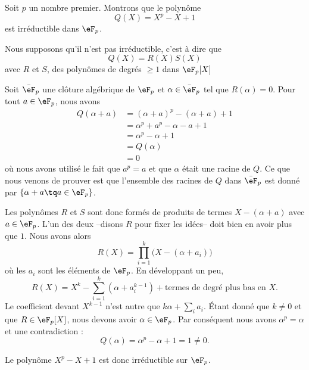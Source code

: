 \begin{example}     \label{ExfUqQXQ}
    Soit \( p\) un nombre premier. Montrons que le polynôme
    \begin{equation}
        Q(X)=X^p-X+1
    \end{equation}
    est irréductible dans \( \eF_p\).

    Nous supposons qu'il n'est pas irréductible, c'est à dire que
    \begin{equation}
        Q(X)=R(X)S(X)
    \end{equation}
    avec \( R\) et \( S\), des polynômes de degrés \( \geq 1\) dans \( \eF_p[X]\)

    Soit \( \bar\eF_p\) une clôture algébrique de \( \eF_p\) et \( \alpha\in \bar \eF_p\) tel que \( R(\alpha)=0\). Pour tout \( a\in \eF_p\), nous avons
    \begin{subequations}
        \begin{align}
            Q(\alpha+a)&=(\alpha+a)^p-(\alpha+a)+1\\
            &=\alpha^p+a^p-\alpha-a+1\\
            &=\alpha^p-\alpha+1\\
            &=Q(\alpha)\\
            &=0
        \end{align}
    \end{subequations}
    où nous avons utilisé le fait que \( a^p=a\) et que \( \alpha\) était une racine de \( Q\). Ce que nous venons de prouver est que l'ensemble des racines de \( Q\) dans \( \bar\eF_p\) est donné par \( \{ \alpha+a\tq a\in \eF_p \}\).

    Les polynômes \( R\) et \( S\) sont donc formés de produits de termes \( X-(\alpha+a)\) avec \( a\in \eF_p\). L'un des deux --disons \( R\) pour fixer les idées-- doit bien en avoir plus que \( 1\). Nous avons alors
    \begin{equation}
        R(X)=\prod_{i=1}^{k}\big( X-(\alpha+a_i) \big)
    \end{equation}
    où les \( a_i\) sont les éléments de \( \eF_p\). En développant un peu,
    \begin{equation}
        R(X)=X^k-\sum_{i=1}^k(\alpha+a_i^{k-1})+\text{termes de degré plus bas en } X.
    \end{equation}
    Le coefficient devant \( X^{k-1}\) n'est autre que \( k\alpha+\sum_ia_i\). Étant donné que \( k\neq 0\) et que \( R\in \eF_p[X]\), nous devons avoir \( \alpha\in \eF_p\). Par conséquent nous avons \( \alpha^p=\alpha\) et une contradiction :
    \begin{equation}
        Q(\alpha)=\alpha^p-\alpha+1=1\neq 0.
    \end{equation}

    Le polynôme \( X^p-X+1\) est donc irréductible sur \( \eF_p\).
\end{example}


